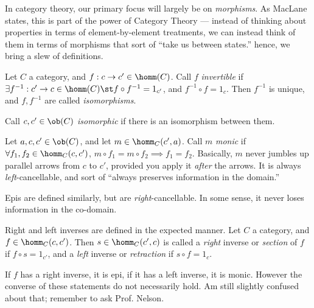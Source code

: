 In category theory, our primary focus will largely be on
\emph{morphisms}. As MacLane states, this is part of the power of
Category Theory --- instead of thinking about properties in terms of
element-by-element treatments, we can instead think of them in terms
of morphisms that sort of ``take us between states.'' hence, we bring
a slew of definitions.\\

\begin{definition}
  Let $C$ a category, and $f : c \to c' \in \homm(C)$. Call $f$
  \emph{invertible} if $\exists f^{-1} : c' \to c \in \homm(C) \st
  f\circ f^{-1} = 1_{c'}$, and $f^{-1} \circ f = 1_c$. Then $f^{-1}$
  is unique, and $f, f^{-1}$ are called \emph{isomorphisms}.\\
\end{definition}
\begin{definition}[Isomorphism]
  Call $c, c' \in \ob(C)$ \emph{isomorphic} if there is an isomorphism
  between them.\\
\end{definition}
\begin{definition}[Monic]
  Let $a,c,c' \in \ob(C)$, and let $m \in \homm_C(c', a)$. Call $m$
  \emph{monic} if $\forall f_1, f_2 \in \homm_C(c,c')$, $m \circ f_1 =
  m \circ f_2 \implies f_1 = f_2$. Basically, $m$ never jumbles up
  parallel arrows from $c$ to $c'$, provided you apply it \emph{after}
  the arrows. It is always \emph{left}-cancellable, and sort of
  ``always preserves information in the domain.''\\
\end{definition}
\begin{definition}[Epi]
  Epis are defined similarly, but are \emph{right}-cancellable. In
  some sense, it never loses information in the co-domain.\\
\end{definition}
\begin{definition}
  Right and left inverses are defined in the expected manner. Let $C$
  a category, and $f \in \homm_C(c,c')$. Then $s \in \homm_C(c', c)$
  is called a \emph{right} inverse or \emph{section} of $f$ if $f\circ
  s = 1_{c'}$, and a \emph{left} inverse or \emph{retraction} if
  $s\circ f = 1_c$. \\
\end{definition}
If $f$ has a right inverse, it is epi, if it has a left inverse, it is
monic. However the converse of these statements do not necessarily
hold. Am still slightly confused about that; remember to ask Prof.
Nelson.

